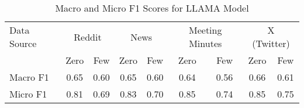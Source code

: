 \begin{table}[htbp]
\centering
\begin{tabular}{l *{8}{c}}
\toprule
Data Source & \multicolumn{2}{c}{Reddit} & \multicolumn{2}{c}{News} & \multicolumn{2}{c}{Meeting Minutes} & \multicolumn{2}{c}{X (Twitter)} \\
& Zero & Few & Zero & Few & Zero & Few & Zero & Few \\
\midrule
Macro F1 & 0.65 & 0.60 & 0.65 & 0.60 & 0.64 & 0.56 & 0.66 & 0.61 \\
Micro F1 & 0.81 & 0.69 & 0.83 & 0.70 & 0.85 & 0.74 & 0.85 & 0.75 \\
\bottomrule
\end{tabular}
\caption{Macro and Micro F1 Scores for LLAMA Model}
\label{tab:llama_macro_micro}
\end{table}